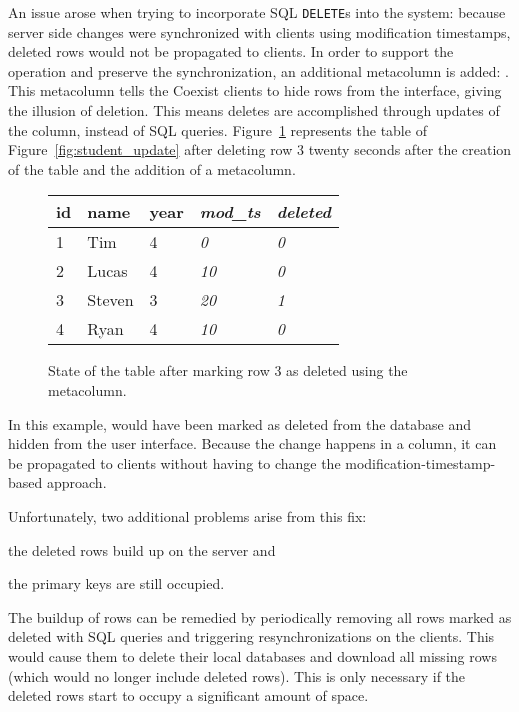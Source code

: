 An issue arose when trying to incorporate SQL \texttt{DELETE}s into the
system: because server side changes were synchronized with clients using
\mbox{modification} timestamps, deleted rows would not be propagated to clients.
In order to support the  operation and preserve the synchronization,
an additional metacolumn is added: .  This metacolumn tells the
Coexist clients to hide rows from the interface, giving the illusion of
deletion.  This means deletes are accomplished through updates of the
 column, instead of SQL  queries.
Figure~\ref{fig:new_deleted} represents the  table of
Figure~\ref{fig:student_update} after deleting row 3 twenty seconds after the
creation of the table and the addition of a  metacolumn.


\begin{figure}[h!]
\center
\begin{tabular}{ l  l  l  l  l}
id  & name      & year  & \textit{mod\_ts} & \textit{deleted} \\ 
\hline
1   & Tim   & 4     & \textit{0}   & \textit{0}     \\
2   & Lucas     & 4     & \textit{10}   & \textit{0}     \\
3   & Steven    & 3     & \textit{20}   & \textit{1}     \\
4   & Ryan      & 4     & \textit{10}   & \textit{0}     \\
\end{tabular}
\caption{State of the  table after marking row 3 as deleted using
the  metacolumn.}
\label{fig:new_deleted}
\end{figure}

In this example,  would have been marked as deleted from the
database and hidden from the user interface. Because the change happens in a
column, it can be propagated to clients without having to change the
modification-timestamp-based approach.

Unfortunately, two additional problems arise from this fix: 
\begin{inparaenum}
\item the deleted rows build up on the server and
\item the primary keys are still occupied. 
\end{inparaenum}
The buildup of rows can be remedied by periodically removing all rows marked as
deleted with SQL  queries and triggering resynchronizations on the
clients. This would cause them to delete their local databases and download all
missing rows (which would no longer include deleted rows). This is only
necessary if the deleted rows start to occupy a significant amount of space.

